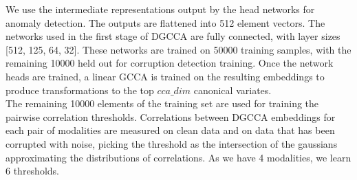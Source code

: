 We use the intermediate representations output by the head networks for anomaly detection. The outputs are flattened into 512 element vectors. The networks used in the first stage of DGCCA are fully connected, with layer sizes [512, 125, 64, 32]. These networks are trained on 50000 training samples, with the remaining 10000 held out for corruption detection training. Once the network heads are trained, a linear GCCA is trained on the resulting embeddings to produce transformations to the top $cca\_dim$ canonical variates.\\

The remaining 10000 elements of the training set are used for training the pairwise correlation thresholds. Correlations between DGCCA embeddings for each pair of modalities are measured on clean data and on data that has been corrupted with noise, picking the threshold as the intersection of the gaussians approximating the distributions of correlations. As we have 4 modalities, we learn 6 thresholds.\\


